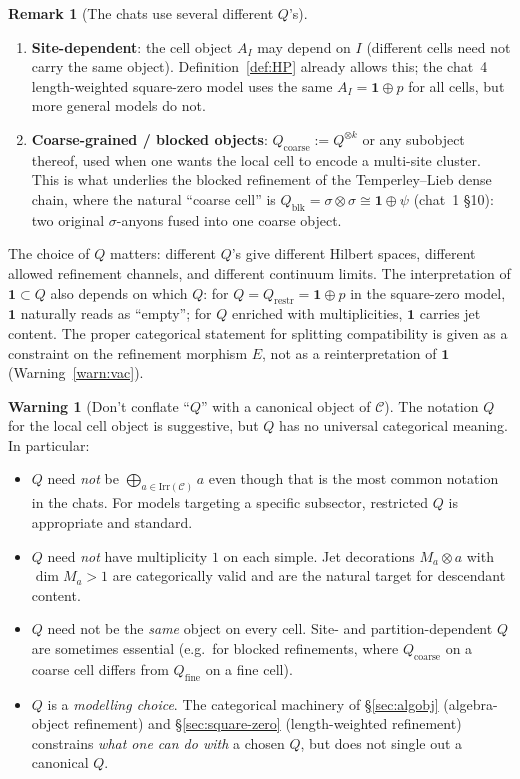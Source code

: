 \documentclass[11pt,a4paper]{article}
\theoremstyle{definition}
\newtheorem{remark}[definition]{Remark}
\newtheorem{warning}[definition]{Warning}
\newcommand{\Cc}{\mathcal{C}}
\newcommand{\Irr}{\mathrm{Irr}}
\newcommand{\one}{\mathbf{1}}
\begin{document}
\begin{remark}[The chats use several different $Q$'s]
\begin{enumerate}[label=(\arabic*)]
\item \textbf{Site-dependent}: the cell object $A_I$ may depend on $I$
(different cells need not carry the same object). Definition~\ref{def:HP}
already allows this; the chat~4 length-weighted square-zero model uses the
same $A_I = \one\oplus p$ for all cells, but more general models do not.
\item \textbf{Coarse-grained / blocked objects}: $Q_{\mathrm{coarse}} :=
Q^{\otimes k}$ or any subobject thereof, used when one wants the local
cell to encode a multi-site cluster. This is what underlies the blocked
refinement of the Temperley--Lieb dense chain, where the natural ``coarse
cell'' is $Q_{\mathrm{blk}} = \sigma\otimes\sigma \cong \one\oplus\psi$
(chat~1 \S10): two original $\sigma$-anyons fused into one coarse object.
\end{enumerate}
The choice of $Q$ matters: different $Q$'s give different Hilbert spaces,
different allowed refinement channels, and different continuum limits.
The interpretation of $\one\subset Q$ also depends on which $Q$: for
$Q = Q_{\mathrm{restr}} = \one\oplus p$ in the square-zero model, $\one$
naturally reads as ``empty''; for $Q$ enriched with multiplicities, $\one$
carries jet content. The proper categorical statement for splitting
compatibility is given as a constraint on the refinement morphism $E$, not
as a reinterpretation of $\one$ (Warning~\ref{warn:vac}).
\end{remark}

\begin{warning}[Don't conflate ``$Q$'' with a canonical object of $\Cc$]\label{warn:Q-not-canonical}
The notation $Q$ for the local cell object is suggestive, but $Q$ has no
universal categorical meaning. In particular:
\begin{itemize}
\item $Q$ need \emph{not} be $\bigoplus_{a\in\Irr(\Cc)}a$ even though that
      is the most common notation in the chats. For models targeting a
      specific subsector, restricted $Q$ is appropriate and standard.
\item $Q$ need \emph{not} have multiplicity $1$ on each simple. Jet
      decorations $M_a\otimes a$ with $\dim M_a > 1$ are categorically valid
      and are the natural target for descendant content.
\item $Q$ need not be the \emph{same} object on every cell. Site- and
      partition-dependent $Q$ are sometimes essential (e.g.\ for blocked
      refinements, where $Q_\mathrm{coarse}$ on a coarse cell differs from
      $Q_\mathrm{fine}$ on a fine cell).
\item $Q$ is a \emph{modelling choice}. The categorical machinery of
      \S\ref{sec:algobj} (algebra-object refinement) and
      \S\ref{sec:square-zero} (length-weighted refinement) constrains
      \emph{what one can do with} a chosen $Q$, but does not single out a
      canonical $Q$.
\end{itemize}
\end{warning}
\end{document}
